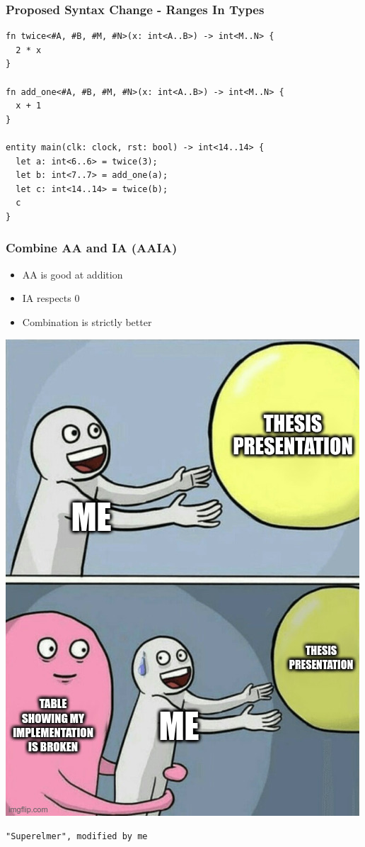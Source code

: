 \documentclass{beamer}
\begin{document}
\begin{frame}[containsverbatim]
\frametitle{Proposed Syntax Change - Ranges In Types}

\small
\begin{verbatim}
fn twice<#A, #B, #M, #N>(x: int<A..B>) -> int<M..N> {
  2 * x
}

fn add_one<#A, #B, #M, #N>(x: int<A..B>) -> int<M..N> {
  x + 1
}

entity main(clk: clock, rst: bool) -> int<14..14> {
  let a: int<6..6> = twice(3);
  let b: int<7..7> = add_one(a);
  let c: int<14..14> = twice(b);
  c
}
\end{verbatim}
\end{frame}

\begin{frame}[containsverbatim]
\frametitle{Combine AA and IA (AAIA)}
\begin{itemize}
  \item AA is good at addition
  \item IA respects 0
  \item Combination is strictly better
\end{itemize}
\end{frame}

\begin{frame}[containsverbatim]
\begin{center}
\includegraphics[height=.85\paperheight]{figures/meme.jpg}
\end{center}
\footnotesize
\verb|"Superelmer", modified by me|
\end{frame}
\end{document}
